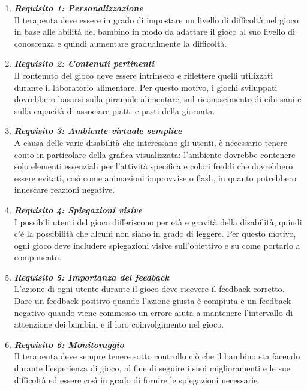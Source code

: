 \begin{enumerate}
\item \textit{\textbf{Requisito 1: Personalizzazione}}\\
Il terapeuta deve essere in grado di impostare un livello di difficoltà nel gioco in base alle abilità del bambino in modo da adattare il gioco al suo livello di conoscenza e quindi aumentare gradualmente la difficoltà.
\item \textit{\textbf{Requisito 2: Contenuti pertinenti}}\\
Il contenuto del gioco deve essere intrinseco e riflettere quelli utilizzati durante il laboratorio alimentare. Per questo motivo, i giochi sviluppati dovrebbero basarsi sulla piramide alimentare, sul riconoscimento di cibi sani e sulla capacità di associare piatti e pasti della giornata.
\item \textit{\textbf{Requisito 3: Ambiente virtuale semplice}}\\
A causa delle varie disabilità che interessano gli utenti, è necessario tenere conto in particolare della grafica visualizzata: l'ambiente dovrebbe contenere solo elementi essenziali per l'attività specifica e colori freddi che dovrebbero essere evitati, così come animazioni improvvise o flash, in quanto potrebbero innescare reazioni negative.
\clearpage
\item \textit{\textbf{Requisito 4: Spiegazioni visive}}\\
I possibili utenti del gioco differiscono per età e gravità della disabilità, quindi c'è la possibilità che alcuni non siano in grado di leggere. Per questo motivo, ogni gioco deve includere spiegazioni visive sull'obiettivo e su come portarlo a compimento.
\item \textit{\textbf{Requisito 5: Importanza del feedback}}\\
L'azione di ogni utente durante il gioco deve ricevere il feedback corretto. Dare un feedback positivo quando l'azione giusta è compiuta e un feedback negativo quando viene commesso un errore aiuta a mantenere l'intervallo di attenzione dei bambini e il loro coinvolgimento nel gioco.
\item \textit{\textbf{Requisito 6: Monitoraggio}}\\
Il terapeuta deve sempre tenere sotto controllo ciò che il bambino sta facendo durante l'esperienza di gioco, al fine di seguire i suoi miglioramenti e le sue difficoltà ed essere così in grado di fornire le spiegazioni necessarie.
\end{enumerate}


